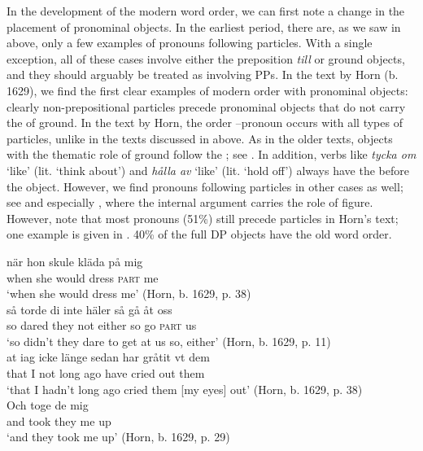 \documentclass[output=paper]{langscibook}
\begin{document}
In the development of the modern word order, we can first note a change in the placement of pronominal objects. In the earliest period, there are, as we saw in  above, only a few examples of pronouns following particles. With a single exception, all of these cases involve either the preposition \textit{till} or ground objects, and they should arguably be treated as involving PPs. In the text by Horn (b. 1629), we find the first clear examples of modern  order with pronominal objects: clearly non-prepositional particles precede pronominal objects that do not carry the  of ground. In the text by Horn, the order –pronoun occurs with all types of particles, unlike in the texts discussed in  above. As in the older texts, objects with the thematic role of ground follow the ; see . In addition,  verbs like \textit{tycka om} ‘like’ (lit. ‘think about’) and \textit{hålla av} ‘like’ (lit. ‘hold off’) always have the  before the object. However, we find pronouns following particles in other cases as well; see  and especially , where the internal argument carries the role of figure. However, note that most pronouns (51\%) still precede particles in Horn’s text; one example is given in . 40\% of the full DP objects have the old word order.


\ea\label{ex:lalu:32}
\ea\label{ex:lalu:32a}
\gll  när   hon   skule     kläda  på   mig\\
    when   she   would   dress    \textsc{part}   me\\
\glt `when she would dress me’ (Horn, b. 1629, p. 38)\\

\ex\label{ex:lalu:32b}
\gll  så   torde     di     inte   häler     så  gå    åt     oss\\
    so   dared   they   not   either   so  go    \textsc{part}   us\\
\glt `so didn’t they dare to get at us so, either’ (Horn, b. 1629, p. 11)\\
\ex\label{ex:lalu:32c}
\gll at       iag   icke   länge   sedan   har   gråtit   vt     dem \\
    that    I     not   long     ago     have   cried     out   them\\
\glt `that I hadn’t long ago cried them [my eyes] out’ (Horn, b. 1629, p. 38)\\
\z
\ex\label{ex:lalu:33}
\gll  Och       toge   de     mig    \\
and     took   they   me   up\\
\glt `and they took me up’ (Horn, b. 1629, p. 29)\\
\z
\end{document}

